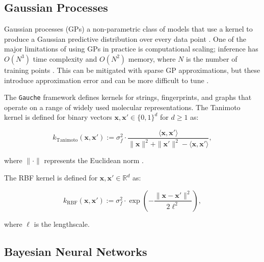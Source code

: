 \subsection{Gaussian Processes}

Gaussian processes (GPs) a non-parametric class of models that use a kernel to produce a Gaussian predictive distribution over every data point \citep{Obrezanova2007, Rasmussen2005}. One of the major limitations of using GPs in practice is computational scaling; inference has $O(N^3)$ time complexity and $O(N^2)$ memory, where $N$ is the number of training points \citep{Rasmussen2005}. This can be mitigated with sparse GP approximations, but these introduce approximation error and can be more difficult to tune \citep{quinonero2005}.


The \texttt{Gauche} framework \citep{gauche} defines kernels for strings, fingerprints, and graphs that operate on a range of widely used molecular representations. The Tanimoto kernel \citep{Ralaivola2005, moss2020} is defined for binary vectors $\mathbf{x}, \mathbf{x}' \in \{0, 1\}^d$ for $d \geq 1$ as:

\begin{equation}
k_{\text{Tanimoto}}(\mathbf{x}, \mathbf{x}') := \sigma_f^2 \cdot \frac{\langle \mathbf{x}, \mathbf{x}' \rangle}{\|\mathbf{x}\|^2 + \|\mathbf{x}'\|^2 - \langle \mathbf{x}, \mathbf{x}' \rangle},
\label{eq:tanimoto_kernel}
\end{equation}

where $\|\cdot\|$ represents the Euclidean norm \citep{gauche}. 

The RBF kernel is defined for
$\mathbf{x}, \mathbf{x}' \in \mathbb{R}^d$ as:

\begin{equation}
k_{\text{RBF}}(\mathbf{x}, \mathbf{x}') := \sigma_f^2 \cdot \exp\left(-\frac{\|\mathbf{x} - \mathbf{x}'\|^2}{2\ell^2}\right),
\end{equation}

where $\ell$ is the lengthscale.


\subsection{Bayesian Neural Networks}

